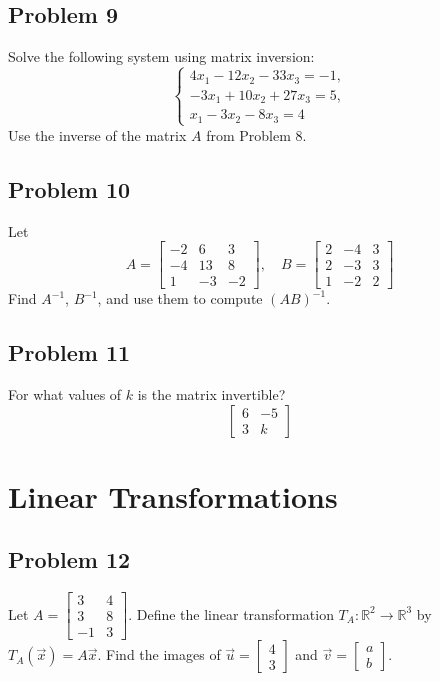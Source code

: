 \documentclass[a4paper, 12pt]{article}
\begin{document}
\subsection*{Problem 9}
Solve the following system using matrix inversion:
\[
\begin{cases}
4x_1 - 12x_2 - 33x_3 = -1, \\
-3x_1 + 10x_2 + 27x_3 = 5, \\
x_1 - 3x_2 - 8x_3 = 4
\end{cases}
\]
Use the inverse of the matrix $A$ from Problem 8.

\subsection*{Problem 10}
Let
\[
A = \begin{bmatrix} -2 & 6 & 3 \\ -4 & 13 & 8 \\ 1 & -3 & -2 \end{bmatrix}, \quad
B = \begin{bmatrix} 2 & -4 & 3 \\ 2 & -3 & 3 \\ 1 & -2 & 2 \end{bmatrix}
\]
Find $A^{-1}$, $B^{-1}$, and use them to compute $(AB)^{-1}$.

\subsection*{Problem 11}
For what values of $k$ is the matrix invertible?
\[
\begin{bmatrix}
6 & -5 \\
3 & k
\end{bmatrix}
\]

\section*{Linear Transformations}

\subsection*{Problem 12}
Let $A = \begin{bmatrix} 3 & 4 \\ 3 & 8 \\ -1 & 3 \end{bmatrix}$. Define the linear transformation $T_A: \mathbb{R}^2 \to \mathbb{R}^3$ by $T_A(\vec{x}) = A\vec{x}$. Find the images of $\vec{u} = \begin{bmatrix} 4 \\ 3 \end{bmatrix}$ and $\vec{v} = \begin{bmatrix} a \\ b \end{bmatrix}$.
\end{document}
